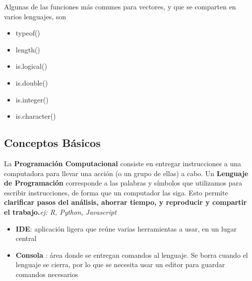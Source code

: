 Algunas de las funciones más comunes para vectores, y que se comparten en varios lenguajes, son 
\begin{itemize}
    \item {typeof()}
    \item {length()}
    \item {is.logical()}
    \item {is.double()}
    \item{is.integer()}
    \item{is.character()}
\end{itemize}

\subsection{Conceptos Básicos}
La \textbf{Programación Computacional} consiste en entregar instrucciones a una computadora para llevar una acción (o un grupo de ellas) a cabo. Un \textbf{Lenguaje de Programación} corresponde a las palabras y símbolos que utilizamos para escribir instrucciones, de forma que un computador las siga. Esto permite \textbf{clarificar pasos del análisis, ahorrar tiempo, y reproducir y compartir el trabajo.}\textit{ej: R, Python, Javascript}
\begin{itemize}
    \item {\textbf{IDE}: aplicación ligera que reúne varias herramientas a usar, en un lugar central}
    \item {\textbf{Consola} : área donde se entregan comandos al lenguaje. Se borra cuando el lenguaje se cierra, por lo que se necesita usar un editor para guardar comandos necesarios}
\end{itemize}

\newpage
